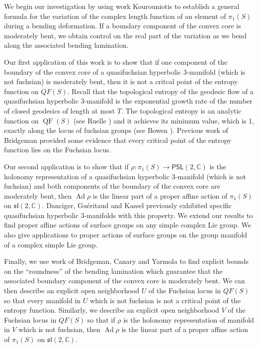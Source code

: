 \documentclass{amsart}
\theoremstyle{plain}
\theoremstyle{definition}
\theoremstyle{remark}
\newcommand{\Ad}{\operatorname{Ad}}
\newcommand{\QF}{\operatorname{QF}}
\newcommand{\PSL}{\mathsf{PSL}}
\newcommand{\C}{\mathbb C}
\renewcommand{\sl}{\mathfrak{sl}}
\newcommand{\<}{\left <}
\renewcommand{\>}{\right >}
\renewcommand{\C}{\mathbb C}
\begin{document}
We begin our investigation by using work  Kourouniotis \cite{kouron,kouron-cont} to establish
a general formula for the variation  of the complex length function of an element  of $\pi_1(S)$ during a bending deformation.
If a boundary component of the convex core is moderately bent, we obtain control on the real part of the variation as
we bend along the associated bending lamination.

Our first application of this work is to show that if one component of the boundary of the  convex core of a quasifuchsian hyperbolic 3-manifold
(which is not fuchsian) is moderately bent, then it is not a critcal point of the entropy function on $QF(S)$.
Recall that the topological entropy of the geodesic flow of a quasifuchsian hyperbolic 3-manifold is the exponential growth
rate of the number of closed geodesics of length at most $T$. The topological entropy is an analytic function on $\QF(S)$ (see Ruelle \cite{ruelle}) and
it achieves its minimum value, which is 1, exactly along the locus of fuchsian groups (see Bowen \cite{bowen}). Previous work of Bridgeman \cite{bridgeman-wp}
provided some evidence that every critical point of the entropy function lies on the Fuchsian locus.

Our second application is to show that  if $\rho:\pi_1(S)\to\PSL(2,\C)$ is the holonomy representation of a quasifuchsian hyperbolic
3-manifold (which is not fuchsian) and both components of the boundary of the convex core are moderately bent, then $\Ad\rho$
is the linear part of a proper affine action of $\pi_1(S)$ on $\sl(2,\C)$. Danciger, Gu\'eritaud and Kassel \cite{DGK-aff} previously
exhibited  specific quasifuchsian hyperbolic 3-manifolds with this property. We extend our results to find proper affine actions of surface groups
on any simple complex Lie group. We also give applications to proper actions of surface groups on the group manifold of a complex simple Lie group.

Finally, we use work of Bridgeman, Canary and Yarmola \cite{BCY} to find explicit bounds on the ``roundness'' of the bending
lamination which guarantee that  the associated boundary component of the convex core is moderately bent. We can then describe
an explicit open neighborhood $U$ of the Fuchsian locus in $QF(S)$ so that every manifold in $U$ which is not fuchsian is not a
critical point of the entropy function. Similarly, we describe
an explicit open neighborhood $V$ of the Fuchsian locus in $QF(S)$ so that if $\rho$ is the holonomy representation of  manifold in $V$ which is not fuchsian,
then $\Ad\rho$ is the linear part of a proper affine action of $\pi_1(S)$ on $\sl(2,\C)$.
\end{document}
